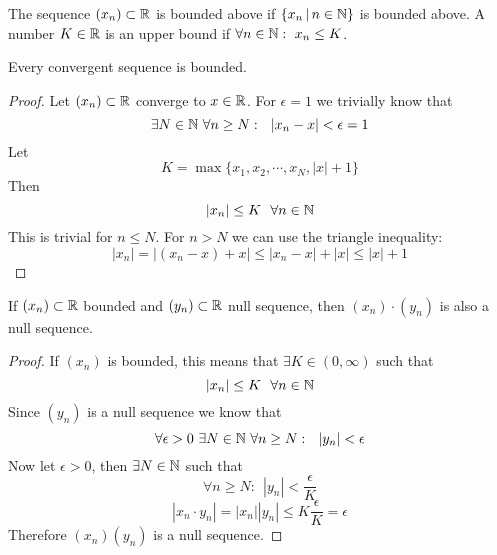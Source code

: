 \documentclass[../../script.tex]{subfiles}
\begin{document}
\begin{defi}
The sequence $(x_n) \subset \mathbb{R}$ is bounded above if $\{x_n \,\vert\, n \in \mathbb{N} \}$ is bounded above. A number $K \in \mathbb{R}$ is an upper bound if $\forall n \in \mathbb{N}: ~x_n \le K$.
\end{defi}

\begin{thm}
Every convergent sequence is bounded.
\end{thm}
\begin{proof}
Let $(x_n) \subset \mathbb{R}$ converge to $x \in \mathbb{R}$. For $\epsilon = 1$ we trivially know that
\begin{equation}
	\exists N \in \mathbb{N} ~\forall n \ge N: ~~|x_n - x| < \epsilon = 1
\end{equation}
Let
\begin{equation}
	K = \max \{x_1, x_2, \cdots, x_N, |x| + 1\}
\end{equation}
Then
\begin{equation}
	|x_n| \le K ~~\forall n \in \mathbb{N}
\end{equation}
This is trivial for $n \le N$. For $n > N$ we can use the triangle inequality:
\begin{equation}
	|x_n| = |(x_n - x) + x| \le |x_n - x| + |x| \le |x| + 1
\end{equation}
\end{proof}

\begin{thm}\label{215}
If $(x_n) \subset \mathbb{R}$ bounded and $(y_n) \subset \mathbb{R}$ null sequence, then $(x_n) \cdot (y_n)$ is also a null sequence.
\end{thm}
\begin{proof}
If $(x_n)$ is bounded, this means that $\exists K \in (0, \infty)$ such that
\begin{equation}
	|x_n| \le K ~~\forall n \in \mathbb{N}
\end{equation}
Since $(y_n)$ is a null sequence we know that
\begin{equation}
	\forall \epsilon > 0 ~\exists N \in \mathbb{N} ~\forall n  \ge N: ~~|y_n| < \epsilon
\end{equation}
Now let $\epsilon > 0$, then $\exists N \in \mathbb{N}$ such that
\begin{equation}
	\forall n \ge N: ~~|y_n| < \frac{\epsilon}{K}
\end{equation}
\begin{equation}
	|x_n \cdot y_n| = |x_n||y_n| \le K \frac{\epsilon}{K} = \epsilon
\end{equation}
Therefore $(x_n)(y_n)$ is a null sequence.
\end{proof}
\end{document}
